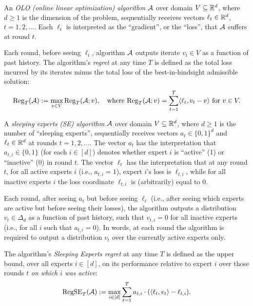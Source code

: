 \begin{definition}
    An \emph{OLO (online linear optimization) algorithm} $\mathcal{A}$ over domain $V \subseteq \mathbb{R}^d$, where $d \geq 1$ is the dimension of the problem, sequentially receives vectors $\ell_t \in \mathbb{R}^d$, $t = 1, 2, \ldots$. Each $\ell_t$ is interpreted as the ``gradient'', or the ``loss'', that $\mathcal{A}$ suffers at round $t$.
    
    Each round, before seeing $\ell_t$, algorithm $\mathcal{A}$ outputs iterate $v_t \in V$ as a function of past history. The algorithm's \emph{regret} at any time $T$ is defined as the total loss incurred by its iterates minus the total loss of the best-in-hindsight admissible solution:
    \[
    \mathrm{Reg}_T(\mathcal{A}) := \max_{v \in V} \mathrm{Reg}_T(\mathcal{A}; v), \quad \text{where } \mathrm{Reg}_T(\mathcal{A}; v) = \sum_{t=1}^T \langle \ell_t, v_t - v \rangle \text{ for } v \in V.
    \]
\end{definition}

\begin{definition}
    A \emph{sleeping experts (SE) algorithm} $\mathcal{A}$ over domain $V \subseteq \mathbb{R}^d$, where $d \geq 1$ is the number of ``sleeping experts'', sequentially receives vectors $a_t \in \{0, 1\}^d$ and $\ell_t \in \mathbb{R}^d$ at rounds $t = 1, 2, \ldots$. The vector $a_t$ has the interpretation that $a_{t, i} \in \{0, 1\}$ (for each $i \in [d]$) denotes whether expert $i$ is ``active'' (1) or ``inactive'' (0) in round $t$. The vector $\ell_t$ has the interpretation that at any round $t$, for all active experts $i$ (i.e., $a_{t, i} = 1$), expert $i$'s loss is $\ell_{t, i}$, while for all inactive experts $i$ the loss coordinate $\ell_{t, i}$ is (arbitrarily) equal to $0$.
    
    Each round, after seeing $a_t$ but before seeing $\ell_t$ (i.e., after seeing which experts are active but before seeing their losses), the algorithm outputs a distribution $v_t \in \Delta_d$ as a function of past history, such that $v_{t, i} = 0$ for all inactive experts (i.e., for all $i$ such that $a_{t, i} = 0$). In words, at each round the algorithm is required to output a distribution $v_t$ over the currently active experts only. 
    
    The algorithm's \emph{Sleeping Experts regret} at any time $T$ is defined as the upper bound, over all experts $i \in [d]$, on its performance relative to expert $i$ over those rounds $t$ \emph{on which $i$ was active}:
    \[
    \mathrm{RegSE}_T(\mathcal{A}) := \max_{i \in [d]} \sum_{t=1}^T a_{t, i} \cdot (\langle \ell_t, v_t \rangle - \ell_{t, i}).
    \]
\end{definition}

